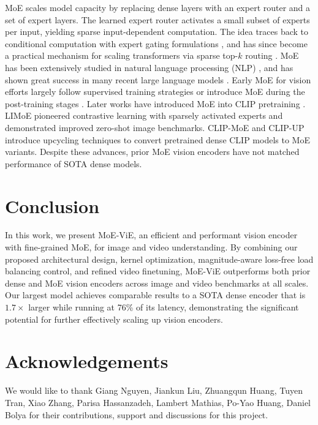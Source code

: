 \documentclass[runningheads]{llncs}
\begin{document}
MoE scales model capacity by replacing dense layers with an expert router and a set of expert layers. The learned expert router activates a small subset of experts per input, yielding sparse input-dependent computation. The idea traces back to conditional computation with expert gating formulations \cite{early_moe_1,early_moe_2,early_moe_4}, and has since become a practical mechanism for scaling transformers via sparse top-$k$ routing \cite{original_moe}. MoE has been extensively studied in natural language processing (NLP) \cite{switch,gshard}, and has shown great success in many recent large language models \cite{qwen3,deepseekv3,gptoss,kimik2,mixtral}. Early MoE for vision efforts largely follow supervised training strategies \cite{vmoe,rmoe,adamv} or introduce MoE during the post-training stages \cite{mome,tove,omni_smola}. Later works have introduced MoE into CLIP pretraining \cite{clip}. LIMoE \cite{liemoe} pioneered contrastive learning with sparsely activated experts and demonstrated improved zero-shot image benchmarks. CLIP-MoE \cite{clip_moe} and CLIP-UP \cite{moe_clipup} introduce upcycling techniques to convert pretrained dense CLIP models to MoE variants. Despite these advances, prior MoE vision encoders have not matched performance of SOTA dense models.

\section{Conclusion}

In this work, we present MoE-ViE, an efficient and performant vision encoder with fine-grained MoE, for image and video understanding. By combining our proposed architectural design, kernel optimization, magnitude-aware loss-free load balancing control, and refined video finetuning, MoE-ViE outperforms both prior dense and MoE vision encoders across image and video benchmarks at all scales. Our largest model achieves comparable results to a SOTA dense encoder that is
$1.7\times$ larger while running at 76\% of its latency, demonstrating the significant potential for further effectively scaling up vision encoders.

\section*{Acknowledgements}
We would like to thank Giang Nguyen, Jiankun Liu, Zhuangqun Huang, Tuyen Tran, Xiao Zhang, Parisa Hassanzadeh, Lambert Mathias, Po-Yao Huang, Daniel Bolya for their contributions, support and discussions for this project.
\end{document}
